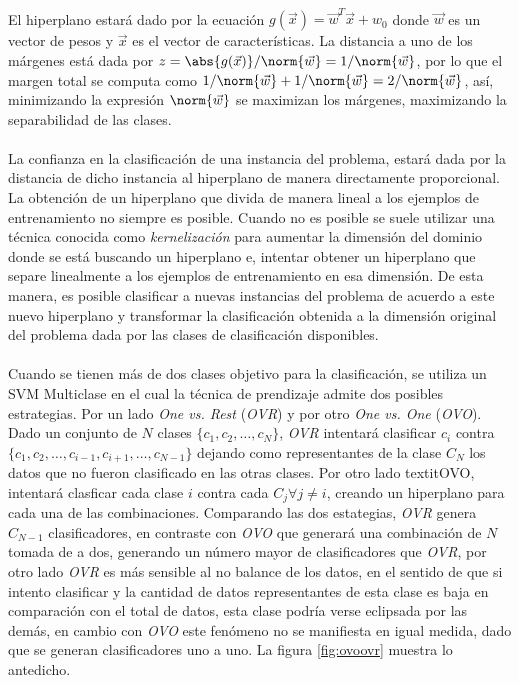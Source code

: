 \paragraph{}El hiperplano estará dado por la ecuación $g(\vec{x}) = \vec{w}^T\vec{x} + w_0$ donde $\vec{w}$ es un vector de pesos y $\vec{x}$ es el vector de características. La distancia a uno de los márgenes está dada por $z = \abs{g(\vec{x})} / \norm{\vec{w}} = 1 / \norm{\vec{w}}$, por lo que el margen total se computa como $1 / \norm{\vec{w}} +  1 / \norm{\vec{w}} = 2 / \norm{\vec{w}}$, así, minimizando la expresión $\norm{\vec{w}}$ se maximizan los márgenes, maximizando la separabilidad de las clases. 

\paragraph{}La confianza en la clasificación de una instancia del problema, estará dada por la distancia de dicho instancia al hiperplano de manera directamente proporcional.
La obtención de un hiperplano que divida de manera lineal a los ejemplos de entrenamiento no siempre es posible. Cuando no es posible se suele utilizar una técnica conocida como \textit{kernelización} para aumentar la dimensión del dominio donde se está buscando un hiperplano e, intentar obtener un hiperplano que separe linealmente a los ejemplos de entrenamiento en esa dimensión. De esta manera, es posible clasificar a nuevas instancias del problema de acuerdo a este nuevo hiperplano y transformar la clasificación obtenida a la dimensión original del problema dada por las clases de clasificación disponibles.

\paragraph{}Cuando se tienen más de dos clases objetivo para la clasificación, se utiliza un SVM Multiclase en el cual la técnica de prendizaje admite dos posibles estrategias. Por un lado \textit{One vs. Rest} (\textit{OVR}) y por otro \textit{One vs. One} (\textit{OVO}). Dado un conjunto de $N$ clases $\{c_1,c_2,\dots,c_N\}$, \textit{OVR} intentará clasificar $c_i$ contra $\{c_1,c_2,\dots,c_{i-1},c_{i+1},\dots,c_{N - 1}\}$ dejando como representantes de la clase $C_N$ los datos que no fueron clasificado en las otras clases. Por otro lado textit{OVO}, intentará clasficar cada clase $i$ contra cada $C_j \forall j \neq i$, creando un hiperplano para cada una de las combinaciones. Comparando las dos estategias, \textit{OVR} genera $C_{N-1}$ clasificadores, en contraste con \textit{OVO} que generará una combinación de $N$ tomada de a dos, generando un número mayor de clasificadores que \textit{OVR}, por otro lado \textit{OVR} es más sensible al no balance de los datos, en el sentido de que si intento clasificar  y la cantidad de datos representantes de esta clase es baja en comparación con el total de datos, esta clase podría verse eclipsada por las demás, en cambio con \textit{OVO} este fenómeno no se manifiesta en igual medida, dado que se generan clasificadores uno a uno. La figura \ref{fig:ovoovr} muestra lo antedicho.


